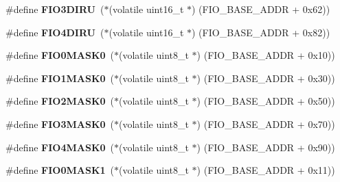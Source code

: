 \begin{DoxyCompactItemize}
\item 
\mbox{\label{group__lpc24xx__regs_gad10fae6c925cf5be068b8673e6abbaaa}} 
\#define {\bfseries F\+I\+O3\+D\+I\+RU}~($\ast$(volatile uint16\+\_\+t $\ast$) (F\+I\+O\+\_\+\+B\+A\+S\+E\+\_\+\+A\+D\+DR + 0x62))
\item 
\mbox{\label{group__lpc24xx__regs_ga49b2d3face4748f3d72da9ba73d787d7}} 
\#define {\bfseries F\+I\+O4\+D\+I\+RU}~($\ast$(volatile uint16\+\_\+t $\ast$) (F\+I\+O\+\_\+\+B\+A\+S\+E\+\_\+\+A\+D\+DR + 0x82))
\item 
\mbox{\label{group__lpc24xx__regs_gad35d1ee2bef886f2842bf4e98a3f4d9c}} 
\#define {\bfseries F\+I\+O0\+M\+A\+S\+K0}~($\ast$(volatile uint8\+\_\+t $\ast$) (F\+I\+O\+\_\+\+B\+A\+S\+E\+\_\+\+A\+D\+DR + 0x10))
\item 
\mbox{\label{group__lpc24xx__regs_ga494315aaa4ca12914bf9e48c178165a4}} 
\#define {\bfseries F\+I\+O1\+M\+A\+S\+K0}~($\ast$(volatile uint8\+\_\+t $\ast$) (F\+I\+O\+\_\+\+B\+A\+S\+E\+\_\+\+A\+D\+DR + 0x30))
\item 
\mbox{\label{group__lpc24xx__regs_gae462d5441867fc184e7d1ef60fab6fe1}} 
\#define {\bfseries F\+I\+O2\+M\+A\+S\+K0}~($\ast$(volatile uint8\+\_\+t $\ast$) (F\+I\+O\+\_\+\+B\+A\+S\+E\+\_\+\+A\+D\+DR + 0x50))
\item 
\mbox{\label{group__lpc24xx__regs_ga3ee71b2112fef0e268adb0ab2ea267f2}} 
\#define {\bfseries F\+I\+O3\+M\+A\+S\+K0}~($\ast$(volatile uint8\+\_\+t $\ast$) (F\+I\+O\+\_\+\+B\+A\+S\+E\+\_\+\+A\+D\+DR + 0x70))
\item 
\mbox{\label{group__lpc24xx__regs_ga142ac54bc7ffd35f5f211bfe69248342}} 
\#define {\bfseries F\+I\+O4\+M\+A\+S\+K0}~($\ast$(volatile uint8\+\_\+t $\ast$) (F\+I\+O\+\_\+\+B\+A\+S\+E\+\_\+\+A\+D\+DR + 0x90))
\item 
\mbox{\label{group__lpc24xx__regs_ga4ea9f0226332072fe73814da39048f77}} 
\#define {\bfseries F\+I\+O0\+M\+A\+S\+K1}~($\ast$(volatile uint8\+\_\+t $\ast$) (F\+I\+O\+\_\+\+B\+A\+S\+E\+\_\+\+A\+D\+DR + 0x11))
\item 

\end{DoxyCompactItemize}
